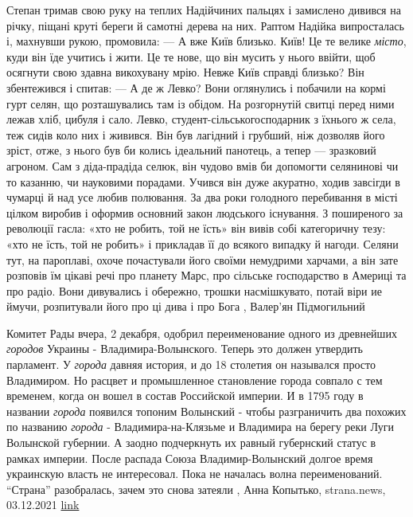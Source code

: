 Степан тримав свою руку на теплих Надійчиних пальцях і замислено дивився на
річку, піщані круті береги й самотні дерева на них. Раптом Надійка випросталась
і, махнувши рукою, промовила: — А вже Київ близько.  Київ! Це те велике \emph{місто},
куди він їде учитись і жити. Це те нове, що він мусить у нього ввійти, щоб
осягнути свою здавна викохувану мрію. Невже Київ справді близько? Він
збентежився і спитав: — А де ж Левко?  Вони оглянулись і побачили на кормі гурт
селян, що розташувались там із обідом.  На розгорнутій свитці перед ними лежав
хліб, цибуля і сало. Левко, студент-сільськогосподарник з їхнього ж села, теж
сидів коло них і живився. Він був лагідний і грубший, ніж дозволяв його зріст,
отже, з нього був би колись ідеальний панотець, а тепер — зразковий агроном.
Сам з діда-прадіда селюк, він чудово вмів би допомогти селянинові чи то
казанню, чи науковими порадами.  Учився він дуже акуратно, ходив завсігди в
чумарці й над усе любив полювання.  За два роки голодного перебивання в місті
цілком виробив і оформив основний закон людського існування. З поширеного за
революції гасла: «хто не робить, той не їсть» він вивів собі категоричну тезу:
«хто не їсть, той не робить» і прикладав її до всякого випадку й нагоди. Селяни
тут, на пароплаві, охоче почастували його своїми немудрими харчами, а він зате
розповів їм цікаві речі про планету Марс, про сільське господарство в Америці
та про радіо. Вони дивувались і обережно, трошки насмішкувато, потай віри ие
ймучи, розпитували його про ці дива і про Бога
, Валер'ян Підмогильний

Комитет Рады вчера, 2 декабря, одобрил переименование одного из древнейших
\emph{городов} Украины - Владимира-Волынского. Теперь это должен утвердить парламент.
У \emph{города} давняя история, и до 18 столетия он назывался просто Владимиром. Но
расцвет и промышленное становление города совпало с тем временем, когда он
вошел в состав Российской империи. И в 1795 году в названии \emph{города} появился
топоним Волынский - чтобы разграничить два похожих по названию \emph{города} -
Владимира-на-Клязьме и Владимира на берегу реки Луги Волынской губернии. 
А заодно подчеркнуть их равный губернский статус в рамках империи. 
После распада Союза Владимир-Волынский долгое время украинскую власть не
интересовал. Пока не началась волна переименований.
\enquote{Страна} разобралась, зачем это снова затеяли
, 
Анна Копытько, strana.news, 03.12.2021
\href{https://strana.news/news/355751-vladimir-volynskij-pereimenujut-kohda-i-kak.html}{link}


